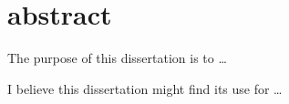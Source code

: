 \chapter*{abstract}

The purpose of this dissertation is to \dots

I believe this dissertation might find its use for \dots

\clearpage
